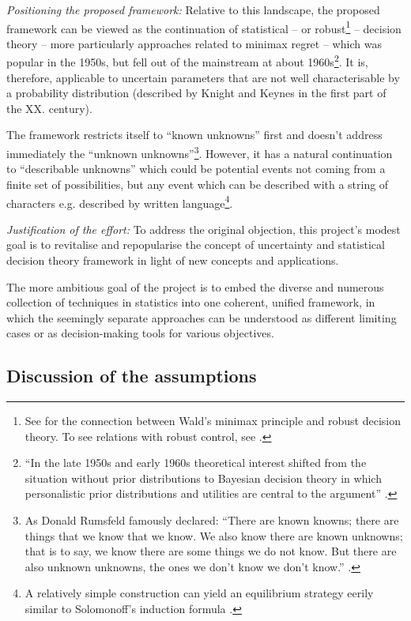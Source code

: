 \documentclass{article}
\begin{document}
{\it Positioning the proposed framework:}
Relative to this landscape, the proposed framework can be viewed as the continuation of statistical -- or robust\footnote{See \cite{book:RobustnessAnalysis} for the connection between Wald's minimax principle and robust decision theory. To see relations with robust control, see \cite{book:Control,book:RobustAndOptimalControl}.} -- decision theory -- more particularly approaches related to minimax regret -- which was popular in the 1950s, but fell out of the mainstream at about 1960s\footnote{``In the late 1950s and early 1960s theoretical interest shifted from the situation without prior distributions to Bayesian decision theory in which personalistic prior distributions and utilities are central to the argument'' \cite{book:CoxStatistics}.}. It is, therefore, applicable to uncertain parameters that are not well characterisable by a probability distribution (described by Knight and Keynes in the first part of the XX. century).

The framework restricts itself to ``known unknowns'' first and doesn't address immediately the ``unknown unknowns''\footnote {As Donald Rumsfeld famously declared: ``There are known knowns; there are things that we know that we know. We also know there are known unknowns; that is to say, we know there are some things we do not know. But there are also unknown unknowns, the ones we don’t know we don’t know.'' \cite{book:WhatWeCannotKnow,book:RadicalUncertainty,book:TheBlackSwan}.}. However, it has a natural continuation to ``describable unknowns'' which could be potential events not coming from a finite set of possibilities, but any event which can be described with a string of characters e.g. described by written language\footnote{A relatively simple construction can yield an equilibrium strategy eerily similar to Solomonoff's induction formula \cite{book:Solomonoff}.}.

{\it Justification of the effort:}
To address the original objection, this project's modest goal is to revitalise and repopularise the concept of uncertainty and statistical decision theory framework in light of new concepts and applications.

The more ambitious goal of the project is to embed the diverse and numerous collection of techniques in statistics into one coherent, unified framework, in which the seemingly separate approaches can be understood as different limiting cases or as decision-making tools for various objectives.


\subsection*{Discussion of the assumptions}
\end{document}
